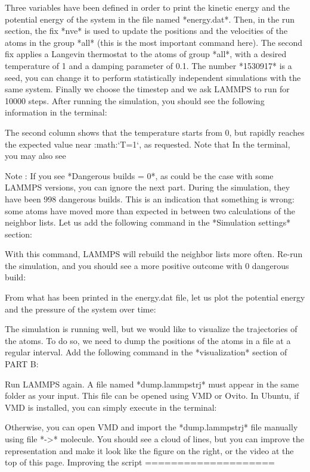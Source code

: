 Three variables have been defined in order
to print the kinetic energy and the potential energy 
of the system in the file named *energy.dat*. Then,
in the run section, the fix *nve* is used to update the
positions and the velocities of the atoms in the group
*all* (this is the most important command here). The second
fix applies a Langevin thermostat to the atoms of group
*all*, with a desired temperature of 1 and a damping
parameter of 0.1. The number *1530917* is a seed, you can
change it to perform statistically independent simulations
with the same system. Finally we choose the timestep
and we ask LAMMPS to run for 10000 steps. After running
the simulation, you should see the following information in
the terminal:

The second column shows that the temperature
starts from 0, but rapidly reaches the
expected value near :math:`T=1`, as requested. 
Note that  In the terminal, you may also see

Note : If you see *Dangerous builds = 0*, as could be
the case with some LAMMPS versions, you can ignore
the next part.
During the simulation, they have been 998 dangerous builds.
This is an indication that something is wrong: some atoms
have moved more than expected in between two calculations of
the neighbor lists. Let us add the following command in the
*Simulation settings* section:

With this command, LAMMPS will rebuild the neighbor lists
more often. Re-run the simulation, and you should see a more
positive outcome with 0 dangerous build:

From what has been printed in the energy.dat file, let us
plot the potential energy and the pressure of
the system over time:

The simulation is running well, but we would like to
visualize the trajectories of the atoms. To do so, we need
to dump the positions of the atoms in a file at a regular
interval. Add the following command in the *visualization*
section of PART B:

Run LAMMPS again. A file named *dump.lammpstrj* must appear in
the same folder as your input. This file can be opened using
VMD or Ovito. In Ubuntu, if VMD is installed, you can simply
execute in the terminal:

Otherwise, you can open VMD and import the *dump.lammpstrj*
file manually using file *->* molecule. You should see a cloud
of lines, but you can improve the representation and make it
look like the figure on the right, or the video at the 
top of this page. 
Improving the script
====================

